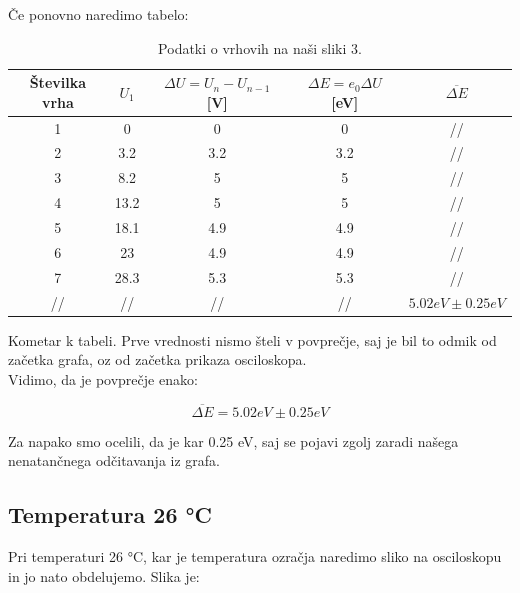 \documentclass[11pt, a4paper]{article}
\theoremstyle{definition}
\theoremstyle{example}
\theoremstyle{izrek}
\begin{document}
Če ponovno naredimo tabelo: 
\begin{table}[h]
	\centering
	\begin{tabular}{|c|c|c|c|c|}
		\hline
		
		Številka vrha & $U_1$ & $\Delta U = U_{n}- U_{n-1}$ [V] & $\Delta E= e_0\Delta U $ [eV] & $\overline{\Delta E}$\\
		\hline
		\hline
		1 & 0 & 0 & 0 & //\\
		\hline
		2 & 3.2 & 3.2 & 3.2 &// \\
		\hline
		3 & 8.2 & 5 & 5 & //\\
		\hline
		4 & 13.2 & 5 & 5 & //\\
		\hline
		5 & 18.1 & 4.9 & 4.9 &//\\
		\hline
		6 & 23 & 4.9 & 4.9 &//\\
		\hline
		7 & 28.3 & 5.3 & 5.3 &//\\
		\hline
		//& //& //&// & $5.02 eV \pm 0.25 eV$\\ 
		\hline
		\hline
	\end{tabular}
	\caption{Podatki o vrhovih na naši sliki 3.}		\label{120 °C}
\end{table}
Kometar k tabeli. Prve vrednosti nismo šteli v povprečje, saj je bil to odmik od začetka grafa, oz od začetka prikaza osciloskopa. \\
Vidimo, da je povprečje enako: 

$$\overline{\Delta E}=5.02 eV \pm 0.25 eV$$

Za napako smo ocelili, da je kar 0.25 eV, saj se pojavi zgolj zaradi našega nenatančnega odčitavanja iz grafa.

\subsection{Temperatura 26 °C}
Pri temperaturi 26 °C, kar je temperatura ozračja naredimo sliko na osciloskopu in jo nato obdelujemo. Slika je: 
\end{document}
